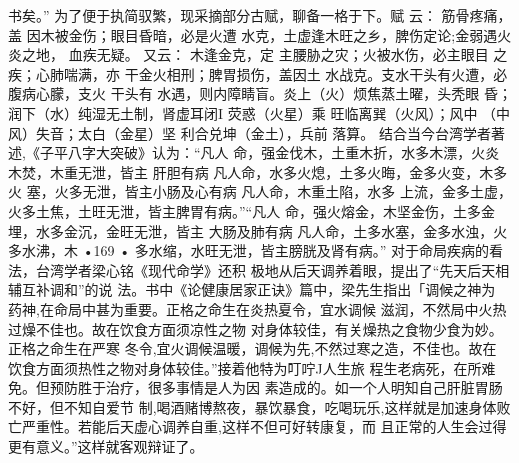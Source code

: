 书矣。”
为了便于执简驭繁，现采摘部分古赋，聊备一格于下。赋
云：
筋骨疼痛，盖 因木被金伤；眼目昏暗，必是火遭
水克，土虚逢木旺之乡，脾伤定论;金弱遇火炎之地，
血疾无疑。
又云：
木逢金克，定 主腰胁之灾；火被水伤，必主眼目
之疾；心肺喘满，亦 干金火相刑；脾胃损伤，盖因土
水战克。支水干头有火遭，必腹病心朦，支火 干头有
水遇，则内障睛盲。炎上（火）烦焦蒸土曜，头秃眼
昏；润下（水）纯湿无土制，肾虚耳闭I 荧惑（火星）乘
旺临离巽（火风）；风中 （中风）失音；太白（金星）坚
利合兑坤（金土），兵前 落算。
结合当今台湾学者著述,《子平八字大突破》认为：“凡人
命，强金伐木，土重木折，水多木漂，火炎木焚，木重无泄，皆主
肝胆有病 凡人命，水多火熄，土多火晦，金多火变，木多火
塞，火多无泄，皆主小肠及心有病 凡人命，木重土陷，水多
上流，金多土虚，火多土焦，土旺无泄，皆主脾胃有病。”“凡人
命，强火熔金，木坚金伤，土多金埋，水多金沉，金旺无泄，皆主
大肠及肺有病 凡人命，土多水塞，金多水浊，火多水沸，木
•169 •
多水缩，水旺无泄，皆主膀胱及肾有病。”
对于命局疾病的看法，台湾学者梁心铭《现代命学》还积
极地从后天调养着眼，提出了“先天后天相辅互补调和”的说
法。书中《论健康居家正诀》篇中，梁先生指出「调候之神为
药神,在命局中甚为重要。正格之命生在炎热夏令，宜水调候
滋润，不然局中火热过燥不佳也。故在饮食方面须凉性之物
对身体较佳，有关燥热之食物少食为妙。正格之命生在严寒
冬令,宜火调候温暖，调候为先,不然过寒之造，不佳也。故在
饮食方面须热性之物对身体较佳。”接着他特为叮咛J人生旅
程生老病死，在所难免。但预防胜于治疗，很多事情是人为因
素造成的。如一个人明知自己肝脏胃肠不好，但不知自爱节
制,喝酒赌博熬夜，暴饮暴食，吃喝玩乐,这样就是加速身体败
亡严重性。若能后天虚心调养自重,这样不但可好转康复，而
且正常的人生会过得更有意义。”这样就客观辩证了。

